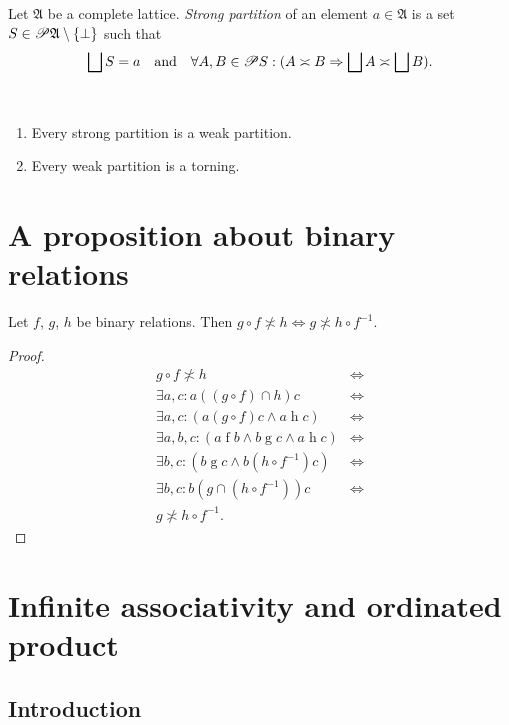 \begin{defn}
Let $\mathfrak{A}$ be a complete lattice.
\emph{Strong partition} of an element $a\in\mathfrak{A}$ is a set
$S\in\mathscr{P}\mathfrak{A}\setminus\{\bot\}$ such that
\[
\bigsqcup S=a\quad\text{and}\quad\forall A,B\in\mathscr{P} S:(A\asymp B\Rightarrow\bigsqcup A\asymp\bigsqcup B).
\]
\end{defn}
\begin{obvious}
~
\begin{enumerate}
\item Every strong partition is a weak partition.
\item Every weak partition is a torning.
\end{enumerate}
\end{obvious}

\section{A proposition about binary relations}
\begin{prop}
\label{rel-cross}Let $f$, $g$, $h$ be binary relations. Then $g\circ f\nasymp h\Leftrightarrow g\nasymp h\circ f^{-1}$.\end{prop}
\begin{proof}
~
\begin{align*}
g\circ f\nasymp h & \Leftrightarrow\\
\exists a,c:a\mathrel{((g\circ f)\cap h)}c & \Leftrightarrow\\
\exists a,c:(a\mathrel{(g\circ f)}c\land a\mathrel{h}c) & \Leftrightarrow\\
\exists a,b,c:(a\mathrel{f}b\land b\mathrel{g}c\land a\mathrel{h}c) & \Leftrightarrow\\
\exists b,c:(b\mathrel{g}c\land b\mathrel{(h\circ f^{-1})}c) & \Leftrightarrow\\
\exists b,c:b\mathrel{(g\cap(h\circ f^{-1}))}c & \Leftrightarrow\\
g\nasymp h\circ f^{-1}.
\end{align*}

\end{proof}

\section{Infinite associativity and ordinated product}


\subsection{Introduction}

